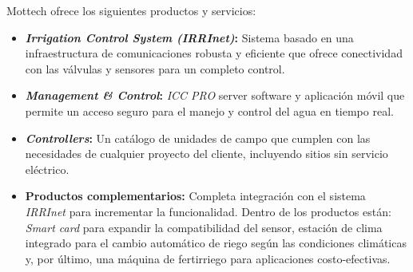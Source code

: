 Mottech ofrece los siguientes productos y servicios:
\begin{itemize}
    \item \textbf{\textit{Irrigation Control System (IRRInet)}:} Sistema basado en una infraestructura de comunicaciones robusta y eficiente que ofrece conectividad con las válvulas y sensores para un completo control.
    \item \textbf{\textit{Management \& Control}:} \textit{ICC PRO} server software y aplicación móvil que permite un acceso seguro para el manejo y control del agua en tiempo real.
    \item \textbf{\textit{Controllers}:} Un catálogo de unidades de campo que cumplen con las necesidades de cualquier proyecto del cliente, incluyendo sitios sin servicio eléctrico.
    \item \textbf{Productos complementarios:} Completa integración con el sistema \textit{IRRInet} para incrementar la funcionalidad. Dentro de los productos están: \textit{Smart card} para expandir la compatibilidad del sensor, estación de clima integrado para el cambio automático de riego según las condiciones climáticas y, por último, una máquina de fertirriego para aplicaciones costo-efectivas. 
\end{itemize}